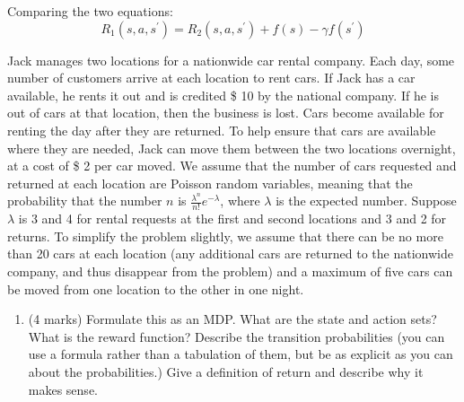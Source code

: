 \documentclass[addpoints,12pt,solution]{exam}
\begin{document}
\begin{questions}
\begin{enumerate}[label=(\alph*)]
\begin{solution}
                Comparing the two equations:
                \[
                    R_1(s, a, s^\prime) = R_2(s, a, s^\prime) + f(s) - \gamma f(s^\prime)
                \]
            \end{solution}

        \end{enumerate}



         Jack manages two locations for a nationwide car rental company. Each day, some number of customers arrive at each location to rent cars. If Jack has a car available, he rents it out and is credited \$ 10 by the national company. If he is out of cars at that location, then the business is lost. Cars become available for renting the day after they are returned. To help ensure that cars are available where they are needed, Jack can move them between the two locations overnight, at a cost of \$ 2 per car moved. We assume that the number of cars requested and returned at each location are Poisson random variables, meaning that the probability that the number $n$ is $\frac{\lambda^n}{n!}e^{-\lambda}$, where $\lambda$ is the expected number. Suppose $\lambda$ is 3 and 4 for rental requests at the first and second locations and 3 and 2 for returns. To simplify the problem slightly, we assume that there can be no more than 20 cars at each location (any additional cars are returned to the nationwide company, and thus disappear from the problem) and a
        maximum of five cars can be moved from one location to the other in one night.

        \begin{enumerate}[label=(\alph*)]

            \item (4 marks) Formulate this as an MDP. What are the state and action sets? What is the reward function? Describe the transition probabilities (you can use a formula rather than a tabulation of them, but be as explicit as you can about the probabilities.) Give a definition of return and describe why it makes sense.

            \begin{solution}

            \end{solution}


\end{enumerate}
\end{questions}
\end{document}
